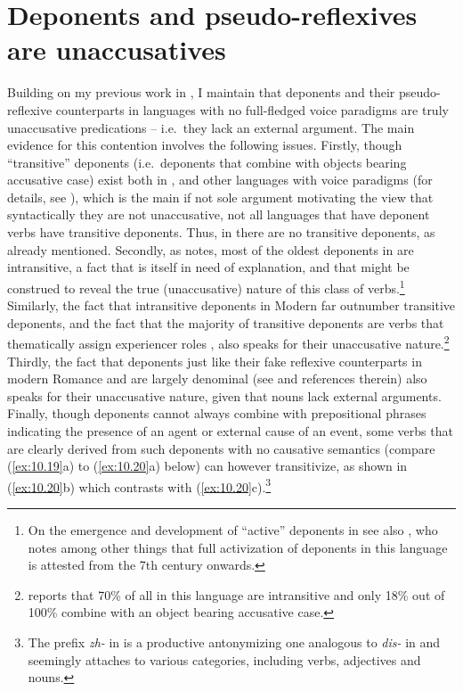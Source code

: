 \documentclass[output=paper]{langsci/langscibook}
\begin{document}
\section{Deponents and pseudo-reflexives are unaccusatives}\label{sec:10.4}

Building on my previous work in \citet{Kallulli2013}, I maintain that deponents
and their pseudo-reflexive counterparts in languages with no full-fledged voice
par\-a\-digms are truly unaccusative predications -- i.e.\ they lack an external
argument. The main evidence for this contention involves the following issues.
Firstly, though \enquote{transitive} deponents (i.e.\ deponents that combine
with objects bearing accusative case) exist both in ,  and other
languages with voice paradigms (for details, see
\citealt{Grestenberger2014,Grestenberger2018a}), which is the main if not sole argument motivating the view that
syntactically they are not unaccusative, not all languages that have deponent
verbs have transitive deponents. Thus, in  there are no transitive
deponents, as already mentioned. Secondly, as \citet[590]{Flobert1975} notes,
most of the oldest deponents in  are intransitive, a fact that is itself
in need of explanation, and that might be construed to reveal the true
(unaccusative) nature of this class of verbs.\footnote{On the emergence and
    development of \enquote{active} deponents in  see also
    \citet{Cennamo2008}, who notes among other things that full activization of
deponents in this language is attested from the 7th century onwards.}
Similarly, the fact that intransitive deponents in Modern  far outnumber
transitive deponents, and the fact that the majority of transitive deponents
are verbs that thematically assign experiencer roles \citep{Zombolou2012}, also
speaks for their unaccusative nature.\footnote{\citet{Zombolou2012} reports
    that 70\% of all  in this language are intransitive and only
18\% out of 100\% combine with an object bearing accusative case.} Thirdly, the
fact that deponents just like their fake reflexive counterparts in modern
Romance and  are largely denominal (see \citealt{Kallulli2013} and
references therein) also speaks for their unaccusative nature, given that nouns
lack external arguments. Finally, though deponents cannot always combine with
prepositional phrases indicating the presence of an agent or external cause of
an event, some verbs that are clearly derived from such deponents with no
causative semantics (compare (\ref{ex:10.19}a) to (\ref{ex:10.20}a)
below) can however transitivize, as shown in (\ref{ex:10.20}b) which
contrasts with (\ref{ex:10.20}c).\footnote{The prefix \emph{zh-} in
     is a productive antonymizing one analogous to \emph{dis-} in
     and seemingly attaches to various categories, including verbs,
adjectives and nouns.}
\end{document}
